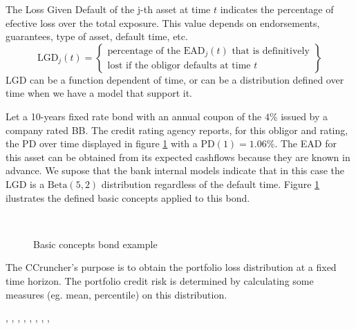 \documentclass[11pt,fleqn]{book} %
\begin{document}
\begin{definition}
	The Loss Given Default of the j-th asset at time $t$ indicates 
	the percentage of efective loss over the total exposure. This
	value depends on endorsements, guarantees, type of asset, 
	default time, etc.
	\begin{displaymath}
		\text{LGD}_j(t) = \left\{
		\begin{array}{c}
			\text{percentage of the $\text{EAD}_j(t)$ that is definitively} \\
			\text{lost if the obligor defaults at time $t$}
		\end{array}
		\right\}
	\end{displaymath}
	LGD can be a function dependent of time, or can be a distribution
	defined over time when we have a model that support it.
\end{definition}

\begin{example}[Bond]
Let a 10-years fixed rate bond with an annual coupon of the
$4\%$ issued by a company rated BB. The credit rating agency 
reports, for this obligor and rating, the PD over time displayed 
in figure \ref{figure:bond} with a $\text{PD}(1)=1.06\%$. 
The EAD for this asset can be obtained from its expected cashflows 
because they are known in advance. We supose that the bank 
internal models indicate that in this case the LGD is a 
$\text{Beta}(5,2)$ distribution regardless of the default time.
Figure \ref{figure:bond} ilustrates the defined basic concepts 
applied to this bond.
\begin{figure}[h!]
\centering
{}
\\
\caption{Basic concepts bond example}
\label{figure:bond} 
\end{figure}
\end{example}


The CCruncher's purpose is to 
obtain the portfolio loss distribution at a fixed time horizon. The 
portfolio credit risk is determined by calculating some measures 
(eg. mean, percentile) on this distribution.

\cite{mcneil:2005}, \cite{sklar:1959}, \cite{li:2000}, 
\cite{roncalli:2001}, \cite{embrechts:2002}, \cite{cmetrics:1997}
\cite{ntzoufras:2009}, \cite{gordy:2002}, \cite{nagpal:2001}
\cite{meissner:2006}, \cite{bis:2006}
\end{document}

